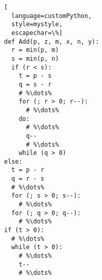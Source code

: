 \begin{lstlisting}[
  language=customPython,
  style=mystyle,
  escapechar=\%]
def Add(p, z, m, x, n, y):
  r = min(p, m)
  s = min(p, n)
  if (r < s):
    t = p - s
    q = s - r
    # %\dots%
    for (; r > 0; r--):
      # %\dots%
    do:
      # %\dots%
      q--
      # %\dots%
    while (q > 0)
else:
  t = p - r
  q = r - s
  # %\dots%
  for (; s > 0; s--):
    # %\dots%
  for (; q > 0; q--):
    # %\dots%
if (t > 0):
  # %\dots%
  while (t > 0):
    # %\dots%
    t--
    # %\dots%
\end{lstlisting}
